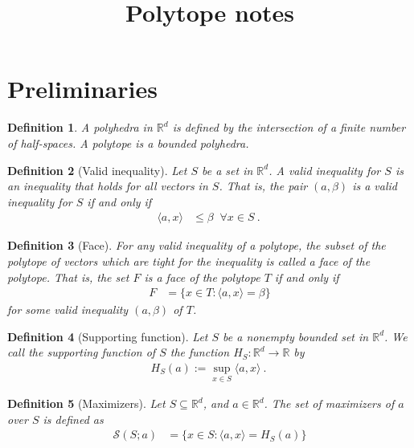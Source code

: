 \documentclass[12pt]{article}
\title{Polytope notes}
\date{}
\newcommand{\reals}{\mathbb{R}}
\newcommand{\inprod}[2]{\langle #1, #2 \rangle}%
\newtheorem{definition}{Definition}
\begin{document}
\maketitle

\section{Preliminaries}
\begin{definition}
	A \emph{polyhedra} in $\reals^d$ is defined by the intersection of a finite number of half-spaces.
	A \emph{polytope} is a bounded polyhedra.
\end{definition}

\begin{definition}[Valid inequality]
	Let $S$ be a set in $\reals^d$.
	A \emph{valid inequality} for $S$ is an inequality that holds for all vectors in $S$.
	That is, the pair $(a,\beta)$ is a valid inequality for $S$ if and only if 
	\begin{align*}
	\inprod{a}{x} &\leq \beta \; \; \forall x \in S~.~
	\end{align*}
\end{definition}

\begin{definition}[Face]\label{def:face}
	For any valid inequality of a polytope, the subset of the polytope of vectors which are tight for the inequality is called a \emph{face} of the polytope.
	That is, the set $F$ is a face of the polytope $T$ if and only if 
	\begin{align*}
	F &= \{x \in T : \inprod{a}{x} = \beta \}
	\end{align*}
	for some valid inequality $(a, \beta)$ of $T$.
\end{definition}

\begin{definition}[Supporting function]
	Let $S$ be a nonempty bounded set in $\reals^d$.
	We call the \emph{supporting function} of $S$ the function $H_S:\reals^d \to \reals$ by
	\begin{align*}
	H_S(a) := \sup_{x \in S}\inprod{a}{x}~.~
	\end{align*} 
\end{definition}

\begin{definition}[Maximizers]
  Let $S \subseteq \reals^d$, and $a \in \reals^d$.
  The \emph{set of maximizers} of $a$ over $S$ is defined as
  \begin{align*}
    \mathcal{S}(S;a) &= \{x \in S : \inprod a x = H_S(a)\}
  \end{align*}
\end{definition}
\end{document}
